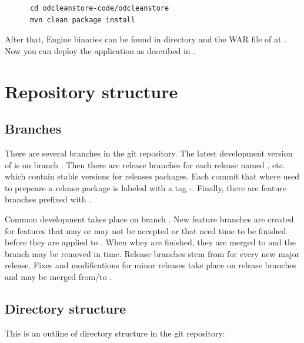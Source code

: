 \begin{verbatim}
      cd odcleanstore-code/odcleanstore
      mvn clean package install
\end{verbatim}

After that, Engine binaries can be found in directory  and the WAR file of \FE at . Now you can deploy the application as described in . 

\section{Repository structure}
\subsection{Branches}
There are several branches in the git repository. The latest development version of is on branch . Then there are release branches for each release named ,  etc. which contain stable versions for  releases  packages. Each commit that where used to prepeare a release package is labeled with a tag -. Finally, there are feature branches prefixed with .

Common development takes place on branch . New feature branches are created for features that may or may not be accepted or that need time to be finished before they are applied to . When whey are finished, they are merged to  and the branch may be removed in time. Release branches stem from  for every new major release. Fixes and modifications for minor releases take place on release branches and may be merged from/to .

\subsection{Directory structure}
This is an outline of directory structure in the git repository:


